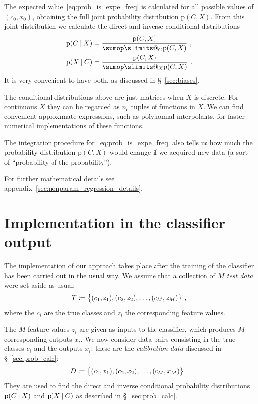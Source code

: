\documentclass[\ifafour a4paper,12pt,\else a5paper,10pt,\fi%
onecolumn,oneside,article,%
british%
]{memoir}
\makeatletter
\theoremstyle{remark}
\theoremstyle{innote}
\def\sum{\DOTSI\sumop\slimits@}
\newcommand*{\defd}{\coloneqq}
\DeclarePairedDelimiter\set{\{}{\}} %
\newcommand*{\p}{\mathrm{p}}%
\renewcommand*{\|}[1][]{\nonscript\:#1\vert\nonscript\:\mathopen{}}
\newcommand*{\sect}{\S}%
\newcommand*{\nc}{n_{\textrm{c}}}
\makeatother
\begin{document}
The expected value~\eqref{eq:prob_is_expe_freq} is calculated for all possible values of $(c_{0}, x_{0})$, obtaining the full joint probability distribution $\p(C, X)$. From this joint distribution we calculate the direct and inverse conditional distributions
\begin{align}
  \label{eq:conditional_direct}
  \p(C \| X) &= \frac{\p(C, X)}{\sum_{C} \p(C, X)} \ , \\
  \label{eq:conditional_inverse}
  \p(X \| C) &= \frac{\p(C, X)}{\sum_{X} \p(C, X)} \ .
\end{align}
It is very convenient to have both, as discussed in \sect~\ref{sec:biases}.

The conditional distributions above are just matrices when $X$ is discrete. For continuous $X$ they can be regarded as $\nc$ tuples of functions in $X$. We can find convenient approximate expressions, such as polynomial interpolants, for faster numerical implementations of these functions.

The integration procedure for~\eqref{eq:prob_is_expe_freq} also tells us how much the probability distribution $\p(C, X)$ would change if we acquired new data (a sort of \enquote{probability of the probability}).

For further mathematical details see appendix~\ref{sec:nonparam_regression_details}.

\section{Implementation in the classifier output}
\label{sec:implem_idea}

The implementation of our approach takes place after the training of the classifier has been carried out in the usual way. We assume that a collection of $M$ \emph{test data} were set aside as usual:
\begin{equation}
  \label{eq:testdata_features}
  T \defd \set[\big]{(c_{1}, z_{1}), (c_{2}, z_{2}), \dotsc, (c_{M}, z_{M})} \ ,
\end{equation}
where the $c_{i}$ are the true classes and $z_{i}$ the corresponding feature values.

The $M$ feature values $z_{i}$ are given as inputs to the classifier, which produces $M$ corresponding outputs $x_{i}$. We now consider data pairs consisting in the true classes $c_{i}$ and the outputs $x_{i}$: these are the \emph{calibration data} discussed in \sect~\ref{sec:prob_calc}:
\begin{equation*}
  D \defd \set[\big]{(c_{1}, x_{1}), (c_{2}, x_{2}), \dotsc, (c_{M}, x_{M}) } \ .
\end{equation*}
They are used to find the direct and inverse conditional probability distributions $\p(C \| X)$ and $\p(X \| C)$ as described in \sect~\ref{sec:prob_calc}.
\end{document}
